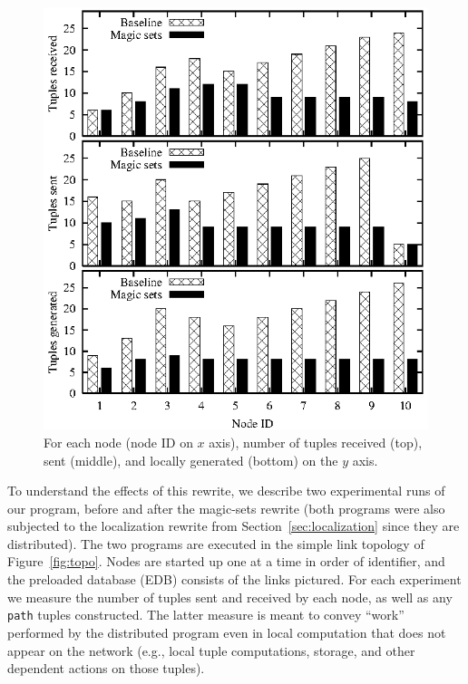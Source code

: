 \documentclass{sigmod08}
\newcommand{\ol}[1]{\texttt{\small #1}\xspace}
\begin{document}
\begin{figure}[htb]
\centering
\includegraphics{results/magicNumbers}
\caption{For each node (node ID on $x$ axis), number of tuples received
  (top), sent (middle), and locally generated (bottom) on the $y$ axis.}
\label{fig:magicresults}
\end{figure}



To understand the effects of this rewrite, we describe two experimental
runs of our program, before and after the magic-sets rewrite (both
programs were also subjected to the localization rewrite from
Section~\ref{sec:localization} since they are distributed).  The two
programs are executed in the simple link topology of
Figure~\ref{fig:topo}. Nodes are started up one at a time in order of
identifier, and the preloaded database (EDB) consists of the links pictured. For each experiment we measure the number of
tuples sent and received by each node, as well as any \ol{path}
tuples constructed. The latter measure is meant to convey ``work''
performed by the distributed program even in local computation that does
not appear on the network (e.g., local tuple computations, storage, and
other dependent actions on those tuples).
\end{document}
